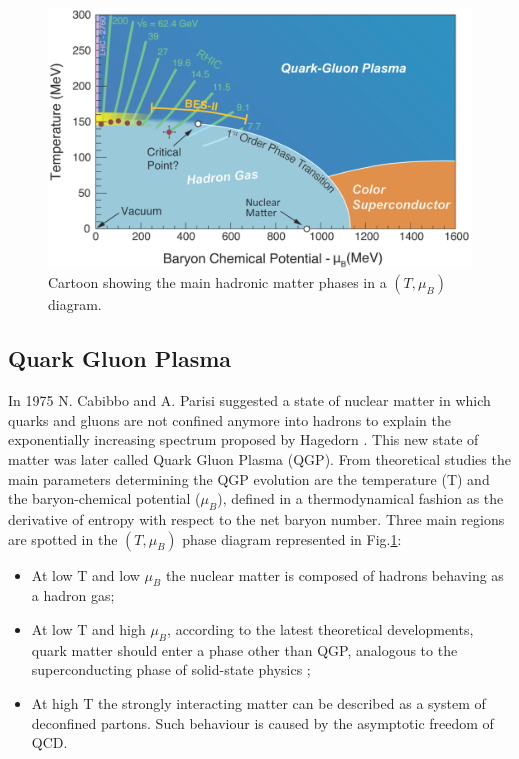 \begin{figure}[!t]
\begin{center}
\includegraphics[width=0.85\linewidth]{Chapters/Introduction/Figs/QGPPhases.pdf}
\caption{Cartoon showing the main hadronic matter phases in a $(T,\mu_B)$ diagram.}
\label{fig:QGPPhases}
\end{center}
\end{figure}

\subsection{Quark Gluon Plasma}
In 1975 N. Cabibbo and A. Parisi \cite{Cabibbo:1975ig} suggested a state of nuclear matter in which quarks and gluons are not confined anymore into hadrons to explain the exponentially increasing spectrum proposed by Hagedorn \cite{Hagedorn:1965st}.
This new state of matter was later called Quark Gluon Plasma (QGP).
From theoretical studies the main parameters determining the QGP evolution are the temperature (T) and the baryon-chemical potential ($\mu_B$), defined in a thermodynamical fashion as the derivative of entropy with respect to the net baryon number.
Three main regions are spotted in the $(T,\mu_B)$ phase diagram represented in Fig.\ref{fig:QGPPhases}:
\begin{itemize}
    \item At low T and low $\mu_B$ the nuclear matter is composed of hadrons behaving as a hadron gas;
    \item At low T and high $\mu_B$, according to the latest theoretical developments, quark matter should enter a phase other than QGP, analogous to the superconducting phase of solid-state physics \cite{Alford:2007xm};
    \item At high T the strongly interacting matter can be described as a system of deconfined partons. Such behaviour is caused by the asymptotic freedom of QCD.
\end{itemize}

